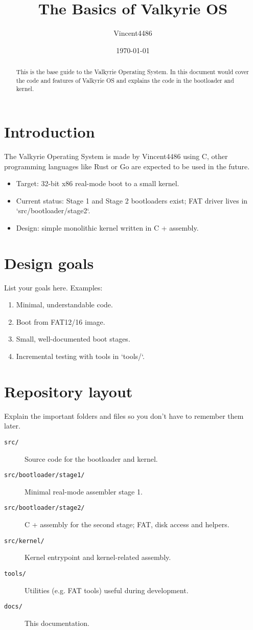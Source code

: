 \documentclass[11pt,a4paper]{article}
\title{The Basics of Valkyrie OS}
\author{Vincent4486}
\date{\today}
\begin{document}
\maketitle
\begin{abstract}
This is the base guide to the Valkyrie Operating System. In this document would cover the code and 
features of Valkyrie OS and explains the code in the bootloader and kernel.
\end{abstract}

\clearpage

\section{Introduction}
The Valkyrie Operating System is made by Vincent4486 using C, other programming languages like Rust
or Go are expected to be used in the future.
\begin{itemize}
	\item Target: 32-bit x86 real-mode boot to a small kernel.
	\item Current status: Stage 1 and Stage 2 bootloaders exist; FAT driver lives in `src/bootloader/stage2`.
	\item Design: simple monolithic kernel written in C + assembly.
\end{itemize}

\section{Design goals}
List your goals here. Examples:
\begin{enumerate}
	\item Minimal, understandable code.
	\item Boot from FAT12/16 image.
	\item Small, well-documented boot stages.
	\item Incremental testing with tools in `tools/`.
\end{enumerate}

\section{Repository layout}
Explain the important folders and files so you don't have to remember them later.
\begin{description}
	\item[\texttt{src/}] Source code for the bootloader and kernel.
	\item[\texttt{src/bootloader/stage1/}] Minimal real-mode assembler stage 1.
	\item[\texttt{src/bootloader/stage2/}] C + assembly for the second stage; FAT, disk access and helpers.
	\item[\texttt{src/kernel/}] Kernel entrypoint and kernel-related assembly.
	\item[\texttt{tools/}] Utilities (e.g. FAT tools) useful during development.
	\item[\texttt{docs/}] This documentation.
\end{description}
\end{document}
